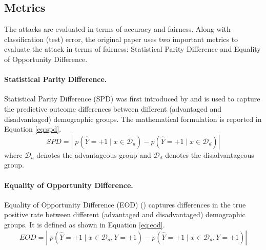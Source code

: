 \subsection{Metrics}
\label{sec:metrics}

The attacks are evaluated in terms of accuracy and fairness. Along with classification (test) error, the original paper uses two important metrics to evaluate the attack in terms of fairness: Statistical Parity Difference and Equality of Opportunity Difference.

\paragraph{Statistical Parity Difference.} Statistical Parity Difference (SPD) was first introduced by \citet{SPD-measure} and is used to capture the predictive outcome differences between different (advantaged and disadvantaged) demographic groups. The mathematical formulation is reported in Equation \ref{eq:spd}.
\begin{equation}
    SPD=\left|\;p\left(\hat{Y}=+1 \mid x \in \mathcal{D}_{a}\right)-p\left(\hat{Y}=+1 \mid x \in \mathcal{D}_{d}\right)\right| \label{eq:spd} 
\end{equation}
where $\mathcal{D}_{a}$ denotes the advantageous group and $\mathcal{D}_{d}$ denotes the disadvantageous group.

\paragraph{Equality of Opportunity Difference.} Equality of Opportunity Difference (EOD) (\citet{EOD-measure}) captures differences in the true positive rate between different (advantaged and disadvantaged) demographic groups. It is defined as shown in Equation \ref{eq:eod}.
\begin{equation}
    EOD=\left|\;p\left(\hat{Y}=+1 \mid x \in \mathcal{D}_{a}, Y=+1\right) -p\left(\hat{Y}=+1 \mid x \in \mathcal{D}_{d}, Y=+1\right) \right| \label{eq:eod} 
\end{equation}

